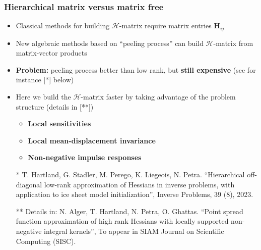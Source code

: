 \documentclass[10pt,final,xcolor=dvipsnames]{beamer}
\begin{document}
\begin{frame}
	\frametitle{Hierarchical matrix versus matrix free}
	\begin{itemize}
	\item Classical methods for building $\mathcal{H}$-matrix require matrix entries $\mathbf{H}_{ij}$
          \vspace{0.05in}
	\item New algebraic methods based on ``peeling process'' can build $\mathcal{H}$-matrix from matrix-vector products
          \vspace{0.05in}
	\item \textbf{Problem:} peeling process better than low rank, but \textbf{still expensive} (see for instance [*] below)
          \vspace{0.05in}
	\item Here we build the $\mathcal{H}$-matrix faster by taking advantage of the problem structure (details in [**])
	  \begin{itemize}
	  \item \textbf{Local sensitivities}
	  \item \textbf{Local mean-displacement invariance}
	  \item \textbf{Non-negative impulse responses}
	  \end{itemize}
	\end{itemize}

        \vspace{0.1in}
        \scriptsize
        \begin{itemize}
        \item [*] {T. Hartland, G. Stadler, M. Perego,
          K. Liegeois, N. Petra. ``Hierarchical off-diagonal low-rank
          approximation of Hessians in inverse problems, with application to
          ice sheet model initialization'', Inverse Problems, 39 (8), 2023. }
          \item [**] {Details in: N. Alger, T. Hartland, N. Petra,
            O. Ghattas. ``Point spread function approximation of high
            rank Hessians with locally supported non-negative integral
            kernels'', To appear in SIAM Journal on Scientific
            Computing (SISC).}
     \end{itemize}

\end{frame}
\end{document}
